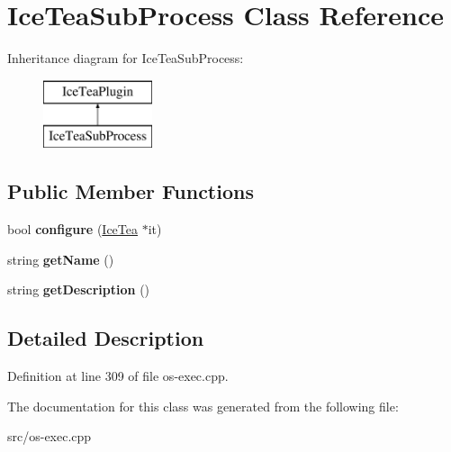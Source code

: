 \hypertarget{class_ice_tea_sub_process}{}\section{Ice\+Tea\+Sub\+Process Class Reference}
\label{class_ice_tea_sub_process}
Inheritance diagram for Ice\+Tea\+Sub\+Process\+:\begin{figure}[H]
\begin{center}
\leavevmode
\includegraphics[height=2.000000cm]{class_ice_tea_sub_process}
\end{center}
\end{figure}
\subsection*{Public Member Functions}
\begin{DoxyCompactItemize}
\item 
bool {\bfseries configure} (\hyperlink{class_ice_tea}{Ice\+Tea} $\ast$it)\hypertarget{class_ice_tea_sub_process_aa34c59bb23b999d8904e540a34a358ed}{}\label{class_ice_tea_sub_process_aa34c59bb23b999d8904e540a34a358ed}

\item 
string {\bfseries get\+Name} ()\hypertarget{class_ice_tea_sub_process_a3cda7702efbfac3e6a31e5630ba0b07b}{}\label{class_ice_tea_sub_process_a3cda7702efbfac3e6a31e5630ba0b07b}

\item 
string {\bfseries get\+Description} ()\hypertarget{class_ice_tea_sub_process_a0212b72fcee56e7e19463b45e26fa939}{}\label{class_ice_tea_sub_process_a0212b72fcee56e7e19463b45e26fa939}

\end{DoxyCompactItemize}


\subsection{Detailed Description}


Definition at line 309 of file os-\/exec.\+cpp.



The documentation for this class was generated from the following file\+:\begin{DoxyCompactItemize}
\item 
src/os-\/exec.\+cpp\end{DoxyCompactItemize}
